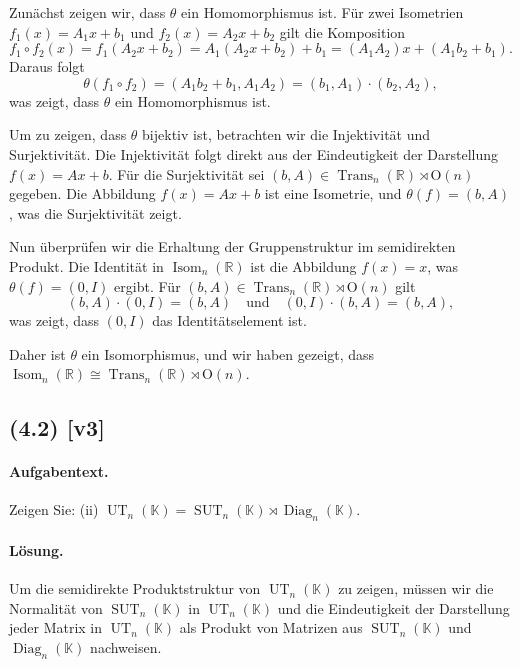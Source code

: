\documentclass[11pt,a4paper]{article}
\begin{document}
Zunächst zeigen wir, dass $\theta$ ein Homomorphismus ist. Für zwei Isometrien $f_1(x) = A_1 x + b_1$ und $f_2(x) = A_2 x + b_2$ gilt die Komposition
\[
f_1 \circ f_2(x) = f_1(A_2 x + b_2) = A_1(A_2 x + b_2) + b_1 = (A_1 A_2)x + (A_1 b_2 + b_1).
\]
Daraus folgt
\[
\theta(f_1 \circ f_2) = (A_1 b_2 + b_1, A_1 A_2) = (b_1, A_1) \cdot (b_2, A_2),
\]
was zeigt, dass $\theta$ ein Homomorphismus ist.

Um zu zeigen, dass $\theta$ bijektiv ist, betrachten wir die Injektivität und Surjektivität. Die Injektivität folgt direkt aus der Eindeutigkeit der Darstellung $f(x) = Ax + b$. Für die Surjektivität sei $(b, A) \in \operatorname{Trans}_n(\mathbb{R}) \rtimes \mathrm{O}(n)$ gegeben. Die Abbildung $f(x) = Ax + b$ ist eine Isometrie, und $\theta(f) = (b, A)$, was die Surjektivität zeigt.

Nun überprüfen wir die Erhaltung der Gruppenstruktur im semidirekten Produkt. Die Identität in $\operatorname{Isom}_n(\mathbb{R})$ ist die Abbildung $f(x) = x$, was $\theta(f) = (0, I)$ ergibt. Für $(b, A) \in \operatorname{Trans}_n(\mathbb{R}) \rtimes \mathrm{O}(n)$ gilt
\[
(b, A) \cdot (0, I) = (b, A) \quad \text{und} \quad (0, I) \cdot (b, A) = (b, A),
\]
was zeigt, dass $(0, I)$ das Identitätselement ist.

Daher ist $\theta$ ein Isomorphismus, und wir haben gezeigt, dass $\operatorname{Isom}_n(\mathbb{R}) \cong \operatorname{Trans}_n(\mathbb{R}) \rtimes \mathrm{O}(n)$.


\subsection*{(4.2) [v3]}
\paragraph{Aufgabentext.}
Zeigen Sie:
(ii) $\operatorname{UT}_n(\mathbb{K})=\operatorname{SUT}_n(\mathbb{K}) \rtimes \operatorname{Diag}_n(\mathbb{K})$.

\paragraph{Lösung.}
Um die semidirekte Produktstruktur von $\operatorname{UT}_n(\mathbb{K})$ zu zeigen, müssen wir die Normalität von $\operatorname{SUT}_n(\mathbb{K})$ in $\operatorname{UT}_n(\mathbb{K})$ und die Eindeutigkeit der Darstellung jeder Matrix in $\operatorname{UT}_n(\mathbb{K})$ als Produkt von Matrizen aus $\operatorname{SUT}_n(\mathbb{K})$ und $\operatorname{Diag}_n(\mathbb{K})$ nachweisen.
\end{document}
